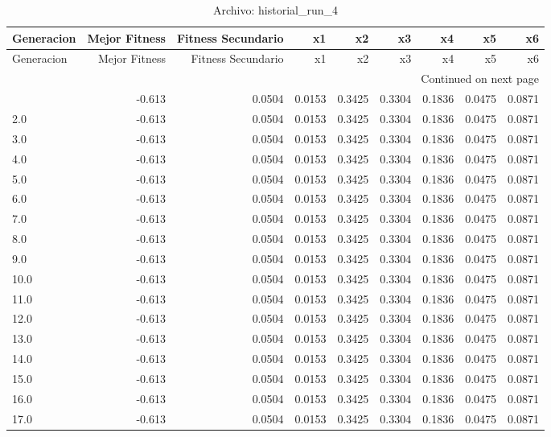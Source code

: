 \begin{longtable}{lrrrrrrrr}
\caption{Archivo: historial\_run\_4}\label{tab:historial_run_4} \\
\toprule
Generacion & Mejor Fitness & Fitness Secundario & x1 & x2 & x3 & x4 & x5 & x6 \\
\midrule
\endfirsthead
\toprule
Generacion & Mejor Fitness & Fitness Secundario & x1 & x2 & x3 & x4 & x5 & x6 \\
\midrule
\endhead
\midrule
\multicolumn{9}{r}{Continued on next page} \\
\midrule
\endfoot
\bottomrule
\endlastfoot
1.0 & -0.613 & 0.0504 & 0.0153 & 0.3425 & 0.3304 & 0.1836 & 0.0475 & 0.0871 \\
2.0 & -0.613 & 0.0504 & 0.0153 & 0.3425 & 0.3304 & 0.1836 & 0.0475 & 0.0871 \\
3.0 & -0.613 & 0.0504 & 0.0153 & 0.3425 & 0.3304 & 0.1836 & 0.0475 & 0.0871 \\
4.0 & -0.613 & 0.0504 & 0.0153 & 0.3425 & 0.3304 & 0.1836 & 0.0475 & 0.0871 \\
5.0 & -0.613 & 0.0504 & 0.0153 & 0.3425 & 0.3304 & 0.1836 & 0.0475 & 0.0871 \\
6.0 & -0.613 & 0.0504 & 0.0153 & 0.3425 & 0.3304 & 0.1836 & 0.0475 & 0.0871 \\
7.0 & -0.613 & 0.0504 & 0.0153 & 0.3425 & 0.3304 & 0.1836 & 0.0475 & 0.0871 \\
8.0 & -0.613 & 0.0504 & 0.0153 & 0.3425 & 0.3304 & 0.1836 & 0.0475 & 0.0871 \\
9.0 & -0.613 & 0.0504 & 0.0153 & 0.3425 & 0.3304 & 0.1836 & 0.0475 & 0.0871 \\
10.0 & -0.613 & 0.0504 & 0.0153 & 0.3425 & 0.3304 & 0.1836 & 0.0475 & 0.0871 \\
11.0 & -0.613 & 0.0504 & 0.0153 & 0.3425 & 0.3304 & 0.1836 & 0.0475 & 0.0871 \\
12.0 & -0.613 & 0.0504 & 0.0153 & 0.3425 & 0.3304 & 0.1836 & 0.0475 & 0.0871 \\
13.0 & -0.613 & 0.0504 & 0.0153 & 0.3425 & 0.3304 & 0.1836 & 0.0475 & 0.0871 \\
14.0 & -0.613 & 0.0504 & 0.0153 & 0.3425 & 0.3304 & 0.1836 & 0.0475 & 0.0871 \\
15.0 & -0.613 & 0.0504 & 0.0153 & 0.3425 & 0.3304 & 0.1836 & 0.0475 & 0.0871 \\
16.0 & -0.613 & 0.0504 & 0.0153 & 0.3425 & 0.3304 & 0.1836 & 0.0475 & 0.0871 \\
17.0 & -0.613 & 0.0504 & 0.0153 & 0.3425 & 0.3304 & 0.1836 & 0.0475 & 0.0871 \\

\end{longtable}
